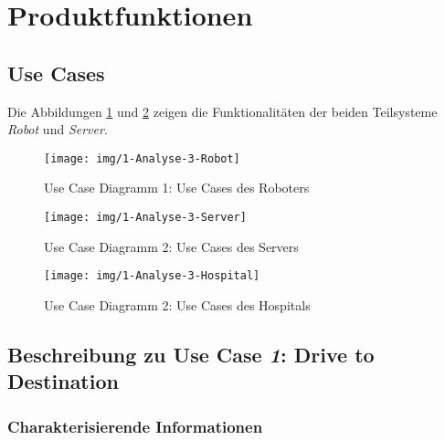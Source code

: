 \section{Produktfunktionen}

		\subsection{Use Cases}
		
		Die Abbildungen \ref{fig:3-1-robot-use-cases} und \ref{fig:3-1-server-use-cases} zeigen die Funktionalitäten der beiden Teilsysteme \emph{Robot} und \emph{Server}.
		
			\begin{figure}[H]
				\centering
				\texttt{[image: img/1-Analyse-3-Robot]}
				\caption{Use Case Diagramm 1: Use Cases des Roboters}
				\label{fig:3-1-robot-use-cases}
			\end{figure}

			\begin{figure}[H]
				\centering
				\texttt{[image: img/1-Analyse-3-Server]}
				\caption{Use Case Diagramm 2: Use Cases des Servers}
				\label{fig:3-1-server-use-cases}
			\end{figure}

			\begin{figure}[H]
				\centering
				\texttt{[image: img/1-Analyse-3-Hospital]}
				\caption{Use Case Diagramm 2: Use Cases des Hospitals}
				\label{fig:3-1-hospital-use-cases}
			\end{figure}

		\pagebreak

		\subsection{Beschreibung zu Use Case \emph{1}: Drive to Destination}

			\subsubsection*{Charakterisierende Informationen}


